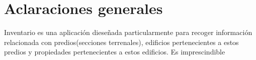 \section{Aclaraciones generales}

Inventario es una aplicación dieseñada particularmente para recoger información relacionada con predios(secciones terrenales), edificios pertenecientes a estos predios
y propiedades pertenecientes a estos edificios.
Es imprescindible